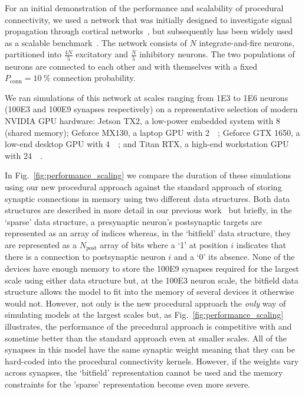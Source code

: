\documentclass[9pt,twocolumn,twoside,lineno]{pnas-new}
\begin{document}
For an initial demonstration of the performance and scalability of procedural connectivity, we used a network that was initially designed to investigate signal propagation through cortical networks~\citep{Vogels2005}, but subsequently has been widely used as a scalable benchmark~\citep{Brette2007}.
The network consists of $N$ integrate-and-fire neurons, partitioned into $\frac{4N}{5}$ excitatory and $\frac{N}{5}$ inhibitory neurons.
The two populations of neurons are connected to each other and with themselves with a fixed $P_{\text{conn}}=\SI{10}{\percent}$ connection probability.

We ran simulations of this network at scales ranging from \num{1E3} to \num{1E6} neurons (\num{100E3} and \num{100E9} synapses respectively) on a representative selection of modern NVIDIA GPU hardware:
Jetson TX2, a low-power embedded system with \SI{8}{\giga\byte} (shared memory);
Geforce MX130, a laptop GPU with \SI{2}{\giga\byte};
Geforce GTX 1650, a low-end desktop GPU with \SI{4}{\giga\byte};
and Titan RTX, a high-end workstation GPU with \SI{24}{\giga\byte}.

In Fig.~\ref{fig:performance_scaling} we compare the duration of these simulations using our new procedural approach against the standard approach of storing synaptic connections in memory using two different data structures.
Both data structures are described in more detail in our previous work~\citep{Knight2018} but briefly, in the `sparse' data structure, a presynaptic neuron's postsynaptic targets are represented as an array of indices whereas, in the `bitfield' data structure, they are represented as a $N_{\text{post}}$ array of bits where a `1' at position $i$ indicates that there is a connection to postsynaptic neuron $i$ and a `0' its absence.
None of the devices have enough memory to store the \num{100E9} synapses required for the largest scale using either data structure but, at the \num{100E3} neuron scale, the bitfield data structure allows the model to fit into the memory of several devices it otherwise would not.
However, not only is the new procedural approach the \emph{only} way of simulating models at the largest scales but, as Fig.~\ref{fig:performance_scaling} illustrates, the performance of the precedural approach is competitive with and sometime better than the standard approach even at smaller scales.
All of the synapses in this model have the same synaptic weight meaning that they can be hard-coded into the procedural connectivity kernels.
However, if the weights vary across synapses, the `bitfield' representation cannot be used and the memory constraints for the 'sparse' representation become even more severe.
%
\end{document}
